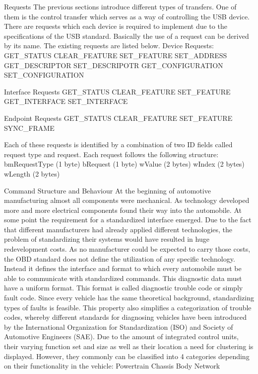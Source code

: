 Requests
The previous sections introduce different types of transfers. One of them is the control transfer which serves as a way of controlling the USB device. There are requests which each device is required to implement due to the specifications of the USB standard. Basically the use of a request can be derived by its name. The existing requests are listed below.
Device Requests:
GET_STATUS
CLEAR_FEATURE
SET_FEATURE
SET_ADDRESS
GET_DESCRIPTOR
SET_DESCRIPOTR
GET_CONFIGURATION
SET_CONFIGURATION

Interface Requests
GET_STATUS
CLEAR_FEATURE
SET_FEATURE
GET_INTERFACE
SET_INTERFACE

Endpoint Requests
GET_STATUS
CLEAR_FEATURE
SET_FEATURE
SYNC_FRAME

Each of these requests is identified by a combination of two ID fields called request type and request. Each request follows the following structure:
bmRequestType (1 byte)
bRequest (1 byte)
wValue (2 bytes)
wIndex (2 bytes)
wLength (2 bytes)


Command Structure and Behaviour
At the beginning of automotive manufacturing almost all components were mechanical. As technology developed more and more electrical components found their way into the automobile. At some point the requirement for a standardized interface emerged. Due to the fact that different manufacturers had already applied different technologies, the problem of standardizing their systems would have resulted in huge redevelopment costs. As no manufacturer could be expected to carry those costs, the OBD standard does not define the utilization of any specific technology. Instead it defines the interface and format to which every automobile must be able to communicate with standardized commands. 
This diagnostic data must have a uniform format. This format is called diagnostic trouble code or simply fault code. Since every vehicle has the same theoretical background, standardizing types of faults is feasible. This property also simplifies a categorization of trouble codes, whereby different standards for diagnosing vehicles have been introduced by the International Organization for Standardization (ISO) and Society of Automotive Engineers (SAE). 
Due to the amount of integrated control units, their varying function set and size as well as their location a need for clustering is displayed. However, they commonly can be classified into 4 categories depending on their functionality in the vehicle:
Powertrain 
Chassis 
Body 
Network

